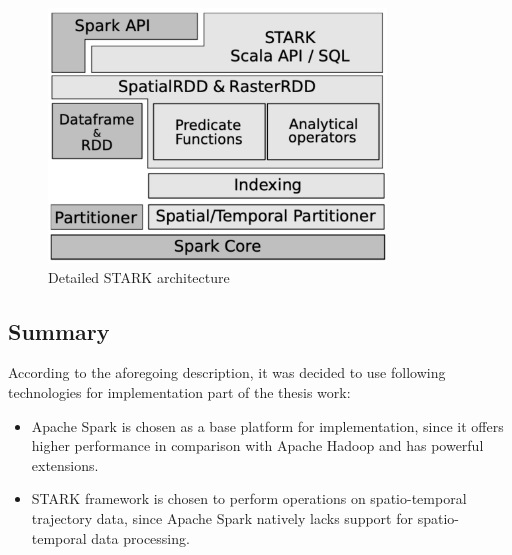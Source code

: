 \begin{figure}[!htb]
	\centering{}
	\includegraphics[width=0.8\textwidth]{images/stark_arch_2.png}
	\caption{Detailed STARK architecture \cite{article:stark_raster}}
	\label{fig:stark_arch_2}
\end{figure}


\subsection{Summary}

According to the aforegoing description, it was decided to use following technologies for implementation part of the thesis work:
\begin{itemize}
	\item Apache Spark is chosen as a base platform for implementation, since it offers higher performance in comparison with Apache Hadoop and has powerful extensions.
	\item  STARK framework is chosen to perform operations on spatio-temporal trajectory data, since Apache Spark natively lacks support for spatio-temporal data processing.
\end{itemize}


